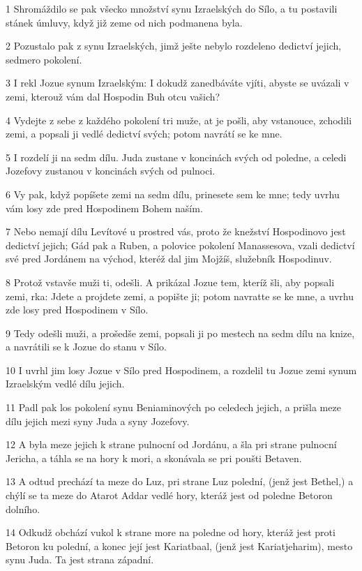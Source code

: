 \par 1 Shromáždilo se pak všecko množství synu Izraelských do Sílo, a tu postavili stánek úmluvy, když již zeme od nich podmanena byla.
\par 2 Pozustalo pak z synu Izraelských, jimž ješte nebylo rozdeleno dedictví jejich, sedmero pokolení.
\par 3 I rekl Jozue synum Izraelským: I dokudž zanedbáváte vjíti, abyste se uvázali v zemi, kterouž vám dal Hospodin Buh otcu vašich?
\par 4 Vydejte z sebe z každého pokolení tri muže, at je pošli, aby vstanouce, zchodili zemi, a popsali ji vedlé dedictví svých; potom navrátí se ke mne.
\par 5 I rozdelí ji na sedm dílu. Juda zustane v koncinách svých od poledne, a celedi Jozefovy zustanou v koncinách svých od pulnoci.
\par 6 Vy pak, když popíšete zemi na sedm dílu, prinesete sem ke mne; tedy uvrhu vám losy zde pred Hospodinem Bohem naším.
\par 7 Nebo nemají dílu Levítové u prostred vás, proto že knežství Hospodinovo jest dedictví jejich; Gád pak a Ruben, a polovice pokolení Manassesova, vzali dedictví své pred Jordánem na východ, kteréž dal jim Mojžíš, služebník Hospodinuv.
\par 8 Protož vstavše muži ti, odešli. A prikázal Jozue tem, kteríž šli, aby popsali zemi, rka: Jdete a projdete zemi, a popište ji; potom navratte se ke mne, a uvrhu zde losy pred Hospodinem v Sílo.
\par 9 Tedy odešli muži, a prošedše zemi, popsali ji po mestech na sedm dílu na knize, a navrátili se k Jozue do stanu v Sílo.
\par 10 I uvrhl jim losy Jozue v Sílo pred Hospodinem, a rozdelil tu Jozue zemi synum Izraelským vedlé dílu jejich.
\par 11 Padl pak los pokolení synu Beniaminových po celedech jejich, a prišla meze dílu jejich mezi syny Juda a syny Jozefovy.
\par 12 A byla meze jejich k strane pulnocní od Jordánu, a šla pri strane pulnocní Jericha, a táhla se na hory k mori, a skonávala se pri poušti Betaven.
\par 13 A odtud prechází ta meze do Luz, pri strane Luz polední, (jenž jest Bethel,) a chýlí se ta meze do Atarot Addar vedlé hory, kteráž jest od poledne Betoron dolního.
\par 14 Odkudž obchází vukol k strane more na poledne od hory, kteráž jest proti Betoron ku polední, a konec její jest Kariatbaal, (jenž jest Kariatjeharim), mesto synu Juda. Ta jest strana západní.
